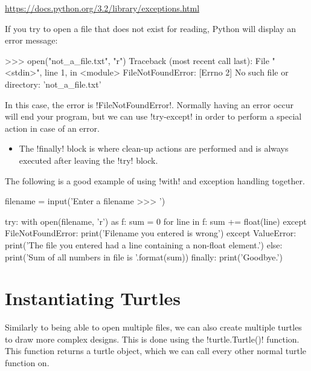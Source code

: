 \documentclass[11pt]{cselabheader}
\begin{document}
\begin{center}
\url{https://docs.python.org/3.2/library/exceptions.html}
\end{center}

If you try to open a file that does not exist for reading, Python will display
an error message:

\begin{pyconcode}
>>> open("not_a_file.txt", "r")
Traceback (most recent call last):
  File "<stdin>", line 1, in <module>
FileNotFoundError: [Errno 2] No such file or directory: 'not_a_file.txt'
\end{pyconcode}

In this case, the error is \pythoninline!FileNotFoundError!. Normally having an
error occur will end your program, but we can use \pythoninline!try-except! in
order to perform a special action in case of an error.

\begin{itemize}
  \item The \pythoninline!finally! block is where clean-up actions are performed
    and is always executed after leaving the \pythoninline!try! block.
\end{itemize}

The following is a good example of using \pythoninline!with! and exception
handling together.

\begin{python3code}
filename = input('Enter a filename >>> ')

try:
    with open(filename, 'r') as f:
        sum = 0
        for line in f:
            sum += float(line)
except FileNotFoundError:
    print('Filename you entered is wrong')
except ValueError:
    print('The file you entered had a line containing a non-float element.')
else:
    print('Sum of all numbers in file is {}'.format(sum))
finally:
    print('Goodbye.')
\end{python3code}

\pagebreak
\section{Instantiating Turtles}
Similarly to being able to open multiple files, we can also create multiple
turtles to draw more complex designs. This is done using the
\pythoninline!turtle.Turtle()! function. This function returns a turtle object,
which we can call every other normal turtle function on.
\end{document}
